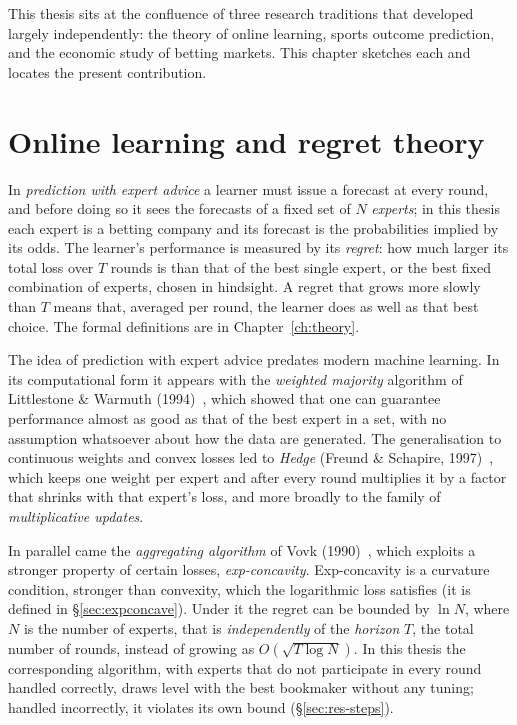 \documentclass[12pt,a4paper,oneside]{report}
\renewcommand{\_}{\oldunderscore\allowbreak}
\theoremstyle{definition}
\theoremstyle{plain}
\theoremstyle{definition}   %
\begin{document}
This thesis sits at the confluence of three research traditions that developed largely
independently: the theory of online learning, sports outcome prediction, and the economic
study of betting markets. This chapter sketches each and locates the present contribution.

\section{Online learning and regret theory}

In \emph{prediction with expert advice} a learner must issue a forecast at every round, and before
doing so it sees the forecasts of a fixed set of $N$ \emph{experts}; in this thesis each expert is
a betting company and its forecast is the probabilities implied by its odds. The learner's
performance is measured by its \emph{regret}: how much larger its total loss over $T$ rounds is
than that of the best single expert, or the best fixed combination of experts, chosen in
hindsight. A regret that grows more slowly than $T$ means that, averaged per round, the learner
does as well as that best choice. The formal definitions are in Chapter~\ref{ch:theory}.

The idea of prediction with expert advice predates modern machine learning. In its
computational form it appears with the \emph{weighted majority} algorithm of Littlestone \&
Warmuth (1994)~\cite{littlestone1994}, which showed that one can guarantee performance almost as good as that of the
best expert in a set, with no assumption whatsoever about how the data are generated. The
generalisation to continuous weights and convex losses led to \emph{Hedge} (Freund \& Schapire,
1997)~\cite{freundschapire1997}, which keeps one weight per expert and after every round
multiplies it by a factor that shrinks with that expert's loss, and more broadly to the family of
\emph{multiplicative updates}.

In parallel came the \emph{aggregating algorithm} of Vovk (1990)~\cite{vovk1990}, which exploits a stronger
property of certain losses, \emph{exp-concavity}. Exp-concavity is a curvature condition, stronger
than convexity, which the logarithmic loss satisfies (it is defined in \S\ref{sec:expconcave}). Under it
the regret can be bounded by $\ln N$, where $N$ is the number of experts, that is
\emph{independently} of the \emph{horizon} $T$, the total number of rounds, instead of growing as
$O(\sqrt{T \log N})$. In this thesis the corresponding algorithm, with experts that do not
participate in every round handled correctly, draws level with the best bookmaker without any
tuning; handled incorrectly, it violates its own bound (\S\ref{sec:res-steps}).
\end{document}
